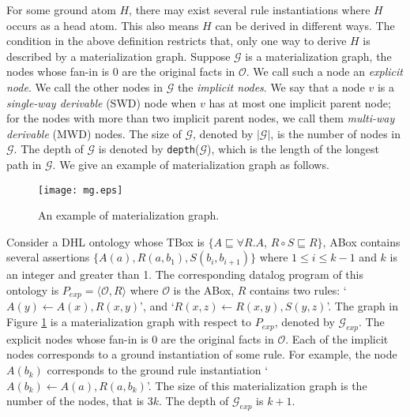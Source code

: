\documentclass{article}
\begin{document}
For some ground atom $H$, there may exist several rule instantiations where $H$ occurs as a head atom. This also means
$H$ can be derived in different ways. The condition in the above definition restricts that, only one way to derive $H$
is described by a materialization graph.
Suppose $\mathcal{G}$ is a materialization graph, the nodes whose fan-in is 0 are the original facts in $\mathcal{O}$. We call such a node an \emph{explicit node}. We call the other nodes in $\mathcal{G}$ the \emph{implicit nodes}. We say that a node
$v$ is a \emph{single-way derivable} (SWD) node when $v$ has at most one implicit parent
node; for the nodes with more than two implicit parent
nodes, we call them \emph{multi-way derivable} (MWD) nodes. The size of $\mathcal{G}$,
denoted by $|\mathcal{G}|$, is the number of nodes in $\mathcal{G}$. The depth of $\mathcal{G}$ is denoted by \texttt{depth}($\mathcal{G}$), which is the length of the longest path in $\mathcal{G}$. We give an example of materialization graph as follows.\\

\begin{figure}[htbp]
\begin{center}
\texttt{[image: mg.eps]}
\caption{An example of materialization graph.}
\label{fig:mg}
\end{center}
\end{figure}

\begin{example}\label{exp:mg}
Consider a DHL ontology whose TBox is $\{$$A\sqsubseteq\forall R.A$, $R\circ S\sqsubseteq R$$\}$, ABox contains several assertions $\{$$A(a),R(a,b_1),S(b_i,b_{i+1})$$\}$ where $1\leq i\leq k-1$ and $k$ is an integer and greater than 1. The corresponding datalog program of this ontology is $P_{exp}=\langle\mathcal{O}, R\rangle$ where $\mathcal{O}$ is the ABox, $R$ contains two rules: `$A(y)\leftarrow A(x),R(x,y)$', and `$R(x,z)\leftarrow R(x,y),S(y,z)$'. The graph in Figure \ref{fig:mg} is a materialization graph with respect to $P_{exp}$, denoted by $\mathcal{G}_{exp}$. The explicit nodes whose fan-in is 0 are the original facts in $\mathcal{O}$. Each of the implicit nodes corresponds to a ground instantiation of some rule. For example, the node $A(b_k)$ corresponds to the ground rule instantiation `$A(b_k)\leftarrow A(a),R(a,b_k)$'. The size of this materialization graph is the number of the nodes, that is $3k$. The depth of $\mathcal{G}_{exp}$ is $k+1$.
\end{example}
\end{document}
